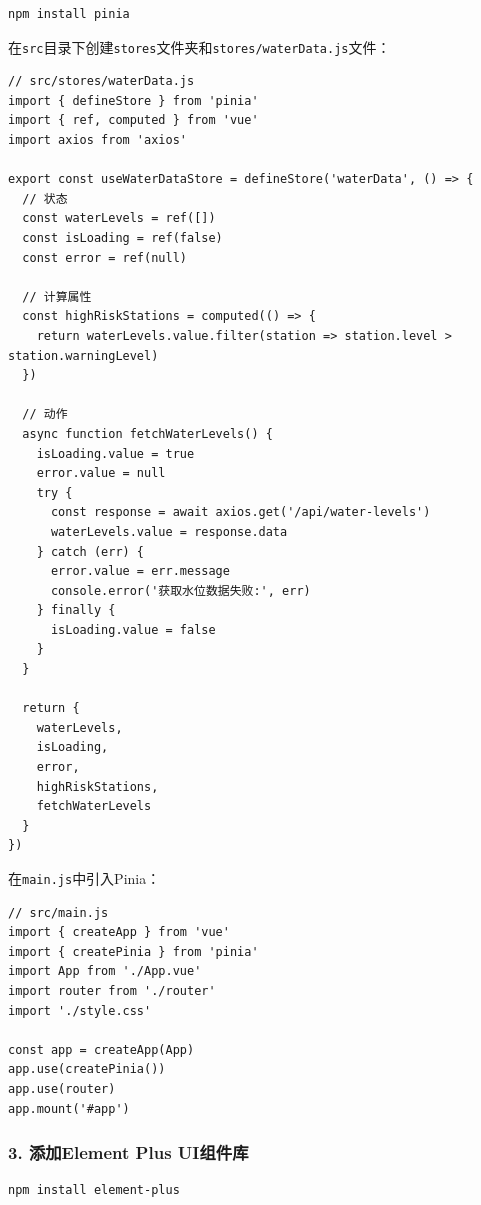 \begin{lstlisting}[language=bash]
npm install pinia
\end{lstlisting}

在\passthrough{\lstinline!src!}目录下创建\passthrough{\lstinline!stores!}文件夹和\passthrough{\lstinline!stores/waterData.js!}文件：

\begin{lstlisting}
// src/stores/waterData.js
import { defineStore } from 'pinia'
import { ref, computed } from 'vue'
import axios from 'axios'

export const useWaterDataStore = defineStore('waterData', () => {
  // 状态
  const waterLevels = ref([])
  const isLoading = ref(false)
  const error = ref(null)
  
  // 计算属性
  const highRiskStations = computed(() => {
    return waterLevels.value.filter(station => station.level > station.warningLevel)
  })
  
  // 动作
  async function fetchWaterLevels() {
    isLoading.value = true
    error.value = null
    try {
      const response = await axios.get('/api/water-levels')
      waterLevels.value = response.data
    } catch (err) {
      error.value = err.message
      console.error('获取水位数据失败:', err)
    } finally {
      isLoading.value = false
    }
  }
  
  return {
    waterLevels,
    isLoading,
    error,
    highRiskStations,
    fetchWaterLevels
  }
})
\end{lstlisting}

在\passthrough{\lstinline!main.js!}中引入Pinia：

\begin{lstlisting}
// src/main.js
import { createApp } from 'vue'
import { createPinia } from 'pinia'
import App from './App.vue'
import router from './router'
import './style.css'

const app = createApp(App)
app.use(createPinia())
app.use(router)
app.mount('#app')
\end{lstlisting}

\subsubsection{3. 添加Element Plus
UI组件库}\label{ux6dfbux52a0element-plus-uiux7ec4ux4ef6ux5e93}

\begin{lstlisting}[language=bash]
npm install element-plus
\end{lstlisting}

